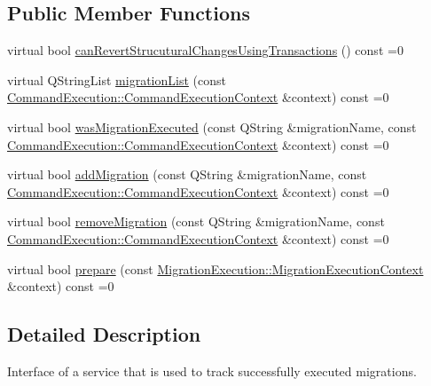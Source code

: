 \subsection*{Public Member Functions}
\begin{DoxyCompactItemize}
\item 
virtual bool \hyperlink{class_q_sql_migrator_1_1_migration_tracker_1_1_migration_tracker_service_a539b5fe686ffd6ae6577c046201f0df3}{can\+Revert\+Strucutural\+Changes\+Using\+Transactions} () const =0
\item 
virtual Q\+String\+List \hyperlink{class_q_sql_migrator_1_1_migration_tracker_1_1_migration_tracker_service_a5de22e070fc1b4f487dbe256e1c874ef}{migration\+List} (const \hyperlink{class_q_sql_migrator_1_1_command_execution_1_1_command_execution_context}{Command\+Execution\+::\+Command\+Execution\+Context} \&context) const =0
\item 
virtual bool \hyperlink{class_q_sql_migrator_1_1_migration_tracker_1_1_migration_tracker_service_a8bb56a82aeefab574a0d7eb2dd5112e5}{was\+Migration\+Executed} (const Q\+String \&migration\+Name, const \hyperlink{class_q_sql_migrator_1_1_command_execution_1_1_command_execution_context}{Command\+Execution\+::\+Command\+Execution\+Context} \&context) const =0
\item 
virtual bool \hyperlink{class_q_sql_migrator_1_1_migration_tracker_1_1_migration_tracker_service_ad9bc087a72a4535e81812a0069dbaa6a}{add\+Migration} (const Q\+String \&migration\+Name, const \hyperlink{class_q_sql_migrator_1_1_command_execution_1_1_command_execution_context}{Command\+Execution\+::\+Command\+Execution\+Context} \&context) const =0
\item 
virtual bool \hyperlink{class_q_sql_migrator_1_1_migration_tracker_1_1_migration_tracker_service_a3041c2cb0027e6a40639ce4c47482c17}{remove\+Migration} (const Q\+String \&migration\+Name, const \hyperlink{class_q_sql_migrator_1_1_command_execution_1_1_command_execution_context}{Command\+Execution\+::\+Command\+Execution\+Context} \&context) const =0
\item 
virtual bool \hyperlink{class_q_sql_migrator_1_1_migration_tracker_1_1_migration_tracker_service_a26dc17b23f3e2a62c9964ce46c740b57}{prepare} (const \hyperlink{class_q_sql_migrator_1_1_migration_execution_1_1_migration_execution_context}{Migration\+Execution\+::\+Migration\+Execution\+Context} \&context) const =0
\end{DoxyCompactItemize}


\subsection{Detailed Description}
Interface of a service that is used to track successfully executed migrations. 

